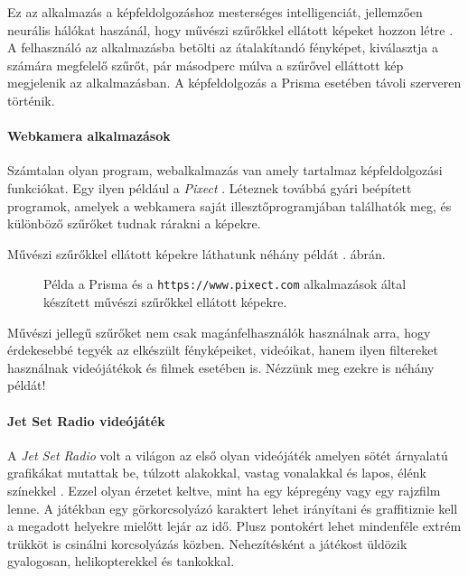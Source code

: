 Ez az alkalmazás a képfeldolgozáshoz mesterséges intelligenciát, jellemzően neurális hálókat haszánál, hogy művészi szűrőkkel ellátott képeket hozzon létre \cite{prisma}. A felhasználó az alkalmazásba betölti az átalakítandó fényképet, kiválasztja a számára megfelelő szűrőt, pár másodperc múlva a szűrővel elláttott kép megjelenik az alkalmazásban. A képfeldolgozás a Prisma esetében távoli szerveren történik.

\paragraph{Webkamera alkalmazások} 

Számtalan olyan program, webalkalmazás van amely tartalmaz képfeldolgozási funkciókat. Egy ilyen például a \textit{Pixect} \cite{pixect}. Léteznek továbbá gyári beépített programok, amelyek a webkamera saját illesztőprogramjában találhatók meg, és különböző szűrőket tudnak rárakni a képekre.

Művészi szűrőkkel ellátott képekre láthatunk néhány példát . ábrán.

\begin{figure}[ht]
\centering
{}
\caption{Példa a Prisma és a \texttt{https://www.pixect.com} alkalmazások által készített művészi szűrőkkel ellátott képekre.} 
\label{fig:prisma}
\end{figure}


Művészi jellegű szűrőket nem csak magánfelhasználók használnak arra, hogy érdekesebbé tegyék az elkészült fényképeiket, videóikat, hanem ilyen filtereket használnak videójátékok és filmek esetében is. Nézzünk meg ezekre is néhány példát!

\paragraph{Jet Set Radio videójáték} 

A \textit{Jet Set Radio} volt a világon az első olyan videójáték amelyen sötét árnyalatú grafikákat mutattak be, túlzott alakokkal, vastag vonalakkal és lapos, élénk színekkel \cite{jetset}. Ezzel olyan érzetet keltve, mint ha egy képregény vagy egy rajzfilm lenne. A játékban egy görkorcsolyázó karaktert lehet irányítani és graffitiznie kell a megadott helyekre mielőtt lejár az idő. Plusz pontokért lehet mindenféle extrém trükköt is csinálni korcsolyázás közben. Nehezítésként a játékost üldözik gyalogosan, helikopterekkel és tankokkal.

